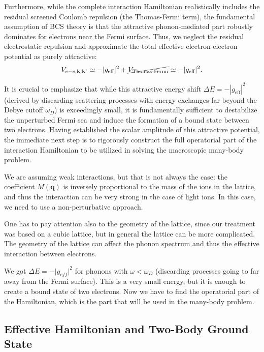 Furthermore, while the complete interaction Hamiltonian realistically includes the residual screened Coulomb repulsion (the Thomas-Fermi term), the fundamental assumption of BCS theory is that the attractive phonon-mediated part robustly dominates for electrons near the Fermi surface. Thus, we neglect the residual electrostatic repulsion and approximate the total effective electron-electron potential as purely attractive:
\[
    V_{e-e,\mathbf{k},\mathbf{k}'} \simeq -|g_{\text{eff}}|^2 + \cancel{V_{\text{Thomas-Fermi}}} \simeq -|g_{\text{eff}}|^2.
\]

It is crucial to emphasize that while this attractive energy shift \( \Delta E = -|g_{\text{eff}}|^2 \) (derived by discarding scattering processes with energy exchanges far beyond the Debye cutoff \( \omega_D \)) is exceedingly small, it is fundamentally sufficient to destabilize the unperturbed Fermi sea and induce the formation of a bound state between two electrons. Having established the scalar amplitude of this attractive potential, the immediate next step is to rigorously construct the full operatorial part of the interaction Hamiltonian to be utilized in solving the macroscopic many-body problem.





We are assuming weak interactions, but that is not always the case: the coefficient \(M(\mathbf{q})\) is inversely proportional to the mass of the ions in the lattice, and thus the interaction can be very strong in the case of light ions. In this case, we need to use a non-perturbative approach.

One has to pay attention also to the geometry of the lattice, since our treatment was based on a cubic lattice, but in general the lattice can be more complicated. The geometry of the lattice can affect the phonon spectrum and thus the effective interaction between electrons.

We got \(\Delta E = - \vert g_{eff} \vert^2 \) for phonons with \(\omega < \omega_D\) (discarding processes going to far away from the Fermi surface). This is a very small energy, but it is enough to create a bound state of two electrons. Now we have to find the operatorial part of the Hamiltonian, which is the part that will be used in the many-body problem.

\subsection{Effective Hamiltonian and Two-Body Ground State}

